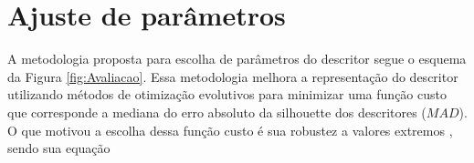 \begin{comment}
\subsection{Visualizaçâo de dados}

A Figura \ref{fig:metodo_4} ilustra o método que empregamos na avaliação da capacidade discriminativa dos descritores de formas através das técnicas de visualização dos dados apresentadas.

\begin{figure}[h!]
  \caption{\label{fig:metodo_4} Método de avaliação de descritores multiescala do contorno de formas. (a) Base de imagens. (b) Extração de características. (c) Descritores de formas. (d) Análise de similaridade a partir da matriz-U. (e) Avaliação de agrupamentos a partir da medida silhouette.}
  \centering
  \texttt{[image: metodo\_v4.png]}
\end{figure}

O primeiro passo consiste em realizar a extração de características num conjunto de formas binárias rotuladas (Figura \ref{fig:metodo_4}a e Figura \ref{fig:metodo_4}b) com o método de descrição sob análise. Como resultado temos um conjunto de descritores, ou vetores de características, das referidas formas (Figura \ref{fig:metodo_4}c). 

A avaliação de qualidade dos descritores se dá qualitativamente e quantitativamente. Na avaliação qualitativa (Figura \ref{fig:metodo_4}d) utilizamos a rede auto-organizável de Kohonen para obtenção da matriz de distâncias unificada, ou matriz-U. Essa última é empregada como ferramenta de visualização dos dados, o que possibilita identificar como o método de descrição sob avaliação agrupa as formas. 

Na avaliação quantitativa (Figura \ref{fig:metodo_4}e) utilizamos os rótulos e os vetores de características das formas para calculamos a medida de avaliação de agrupamentos \emph{Silhouette} \cite{Rousseeuw:1987}. Valores médios dessa medida, por classe de formas, indica a habilidade dos descritores em discriminar formas que pertençam a classes distintas e de agrupar formas que pertençam a uma mesma classe.
\end{comment}
\section{Ajuste de parâmetros}
A metodologia proposta para escolha de parâmetros do descritor segue o esquema da Figura \ref{fig:Avaliacao}. Essa metodologia melhora a representação do descritor utilizando métodos de otimização evolutivos para minimizar uma função custo que corresponde a mediana do erro absoluto da silhouette dos descritores ($MAD$). O que motivou a escolha dessa função custo é sua robustez a valores extremos \cite{Rousseeuw:1987:2}, sendo sua equação 

